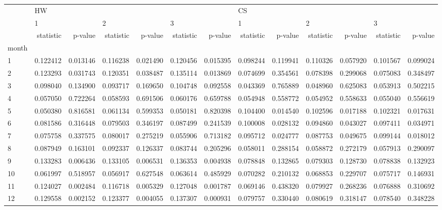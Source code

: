 \begin{tabular}{lrrrrrrrrrrrr}
\toprule
{} & \multicolumn{6}{l}{HW} & \multicolumn{6}{l}{CS} \\
{} & \multicolumn{2}{l}{1} & \multicolumn{2}{l}{2} & \multicolumn{2}{l}{3} & \multicolumn{2}{l}{1} & \multicolumn{2}{l}{2} & \multicolumn{2}{l}{3} \\
{} & statistic &   p-value & statistic &   p-value & statistic &   p-value & statistic &   p-value & statistic &   p-value & statistic &   p-value \\
month &           &           &           &           &           &           &           &           &           &           &           &           \\
\midrule
1     &  0.122412 &  0.013146 &  0.116238 &  0.021490 &  0.120456 &  0.015395 &  0.098244 &  0.119941 &  0.110326 &  0.057920 &  0.101567 &  0.099024 \\
2     &  0.123293 &  0.031743 &  0.120351 &  0.038487 &  0.135114 &  0.013869 &  0.074699 &  0.354561 &  0.078398 &  0.299068 &  0.075083 &  0.348497 \\
3     &  0.098040 &  0.134900 &  0.093717 &  0.169650 &  0.104748 &  0.092558 &  0.043369 &  0.765889 &  0.048960 &  0.625083 &  0.053913 &  0.502215 \\
4     &  0.057050 &  0.722264 &  0.058593 &  0.691506 &  0.060176 &  0.659788 &  0.054948 &  0.558772 &  0.054952 &  0.558633 &  0.055040 &  0.556619 \\
5     &  0.050380 &  0.816581 &  0.061134 &  0.599353 &  0.050181 &  0.820398 &  0.104400 &  0.014540 &  0.102596 &  0.017188 &  0.102321 &  0.017631 \\
6     &  0.081586 &  0.316448 &  0.079503 &  0.346197 &  0.087499 &  0.241539 &  0.100008 &  0.028132 &  0.094860 &  0.043027 &  0.097411 &  0.034971 \\
7     &  0.075758 &  0.337575 &  0.080017 &  0.275219 &  0.055906 &  0.713182 &  0.095712 &  0.024777 &  0.087753 &  0.049675 &  0.099144 &  0.018012 \\
8     &  0.087949 &  0.163101 &  0.092337 &  0.126337 &  0.083744 &  0.205296 &  0.058011 &  0.288154 &  0.058872 &  0.272179 &  0.057913 &  0.290097 \\
9     &  0.133283 &  0.006436 &  0.133105 &  0.006531 &  0.136353 &  0.004938 &  0.078848 &  0.132865 &  0.079303 &  0.128730 &  0.078838 &  0.132923 \\
10    &  0.061997 &  0.518957 &  0.056917 &  0.627548 &  0.063614 &  0.485929 &  0.070282 &  0.210132 &  0.068853 &  0.229707 &  0.075717 &  0.146931 \\
11    &  0.124027 &  0.002484 &  0.116718 &  0.005329 &  0.127048 &  0.001787 &  0.069146 &  0.438320 &  0.079927 &  0.268236 &  0.076888 &  0.310692 \\
12    &  0.129558 &  0.002152 &  0.123377 &  0.004055 &  0.137307 &  0.000931 &  0.079757 &  0.330440 &  0.080619 &  0.318147 &  0.078540 &  0.348228 \\
\bottomrule
\end{tabular}
